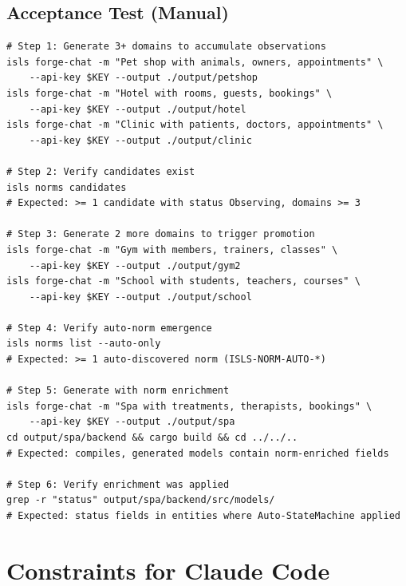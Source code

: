 \documentclass[11pt,a4paper]{article}
\begin{document}
\subsection{Acceptance Test (Manual)}

\begin{lstlisting}[style=bash]
# Step 1: Generate 3+ domains to accumulate observations
isls forge-chat -m "Pet shop with animals, owners, appointments" \
    --api-key $KEY --output ./output/petshop
isls forge-chat -m "Hotel with rooms, guests, bookings" \
    --api-key $KEY --output ./output/hotel
isls forge-chat -m "Clinic with patients, doctors, appointments" \
    --api-key $KEY --output ./output/clinic

# Step 2: Verify candidates exist
isls norms candidates
# Expected: >= 1 candidate with status Observing, domains >= 3

# Step 3: Generate 2 more domains to trigger promotion
isls forge-chat -m "Gym with members, trainers, classes" \
    --api-key $KEY --output ./output/gym2
isls forge-chat -m "School with students, teachers, courses" \
    --api-key $KEY --output ./output/school

# Step 4: Verify auto-norm emergence
isls norms list --auto-only
# Expected: >= 1 auto-discovered norm (ISLS-NORM-AUTO-*)

# Step 5: Generate with norm enrichment
isls forge-chat -m "Spa with treatments, therapists, bookings" \
    --api-key $KEY --output ./output/spa
cd output/spa/backend && cargo build && cd ../../..
# Expected: compiles, generated models contain norm-enriched fields

# Step 6: Verify enrichment was applied
grep -r "status" output/spa/backend/src/models/
# Expected: status fields in entities where Auto-StateMachine applied
\end{lstlisting}


\section{Constraints for Claude Code}
\end{document}
